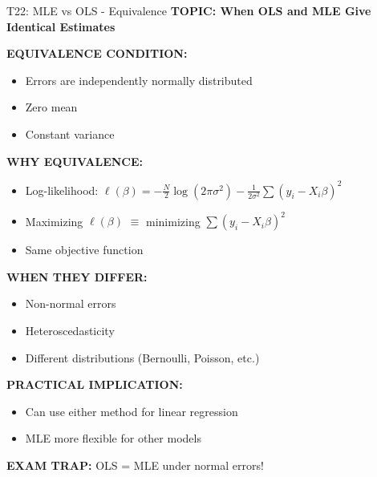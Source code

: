 \documentclass[8pt]{beamer}
\begin{document}
	\begin{frame}{T22: MLE vs OLS - Equivalence}
		\fontsize{6.5}{7.5}\selectfont
		\textbf{TOPIC: When OLS and MLE Give Identical Estimates}
		
		\vspace{0.1cm}
		\textbf{EQUIVALENCE CONDITION:}
		\begin{itemize}
			\item Errors are independently normally distributed
			\item Zero mean
			\item Constant variance
		\end{itemize}
		
		\vspace{0.1cm}
		\textbf{WHY EQUIVALENCE:}
		\begin{itemize}
			\item Log-likelihood: $\ell(\beta) = -\frac{N}{2}\log(2\pi\sigma^2) - \frac{1}{2\sigma^2}\sum(y_i - X_i\beta)^2$
			\item Maximizing $\ell(\beta)$ $\equiv$ minimizing $\sum(y_i - X_i\beta)^2$
			\item Same objective function
		\end{itemize}
		
		\vspace{0.1cm}
		\textbf{WHEN THEY DIFFER:}
		\begin{itemize}
			\item Non-normal errors
			\item Heteroscedasticity
			\item Different distributions (Bernoulli, Poisson, etc.)
		\end{itemize}
		
		\vspace{0.1cm}
		\textbf{PRACTICAL IMPLICATION:}
		\begin{itemize}
			\item Can use either method for linear regression
			\item MLE more flexible for other models
		\end{itemize}
		
		\textcolor{myred}{\textbf{EXAM TRAP:}} OLS = MLE under \textcolor{myblue}{normal errors}!
	\end{frame}
	
\end{document}
